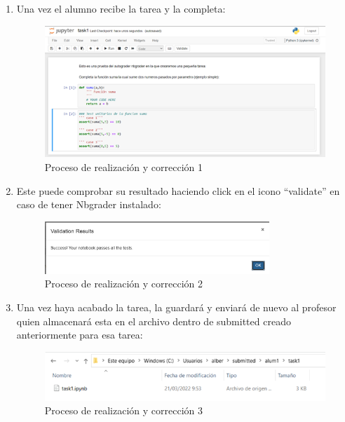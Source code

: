 \begin{enumerate}
\item Una vez el alumno recibe la tarea y la completa: 

\begin{figure}[H]
    \centering
    \includegraphics[width=1\textwidth]{img/prueba/prueba_14.png}
    \caption{Proceso de realización y corrección 1}
\end{figure}

\item Este puede comprobar su resultado haciendo click en el icono “validate” en caso de tener Nbgrader instalado:

\begin{figure}[H]
    \centering
    \includegraphics[width=0.8\textwidth]{img/prueba/prueba_15.png}
    \caption{Proceso de realización y corrección 2}
\end{figure}

\item Una vez haya acabado la tarea, la guardará y enviará de nuevo al profesor quien almacenará esta en el archivo dentro de submitted creado anteriormente para esa tarea:

\begin{figure}[H]
    \centering
    \includegraphics[width=1\textwidth]{img/prueba/prueba_16.png}
    \caption{Proceso de realización y corrección 3}
\end{figure}


\end{enumerate}
